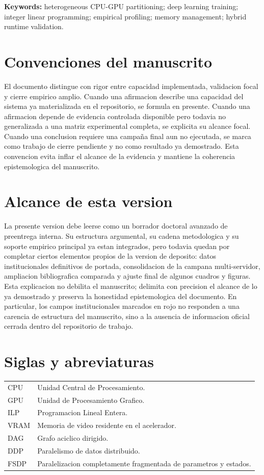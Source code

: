 \vspace{0.6cm}
\noindent\textbf{Keywords:} heterogeneous CPU-GPU partitioning; deep learning training; integer linear programming; empirical profiling; memory management; hybrid runtime validation.

\clearpage

\chapter*{Convenciones del manuscrito}
El documento distingue con rigor entre capacidad implementada, validacion focal y cierre empirico amplio. Cuando una afirmacion describe una capacidad del sistema ya materializada en el repositorio, se formula en presente. Cuando una afirmacion depende de evidencia controlada disponible pero todavia no generalizada a una matriz experimental completa, se explicita su alcance focal. Cuando una conclusion requiere una campaña final aun no ejecutada, se marca como trabajo de cierre pendiente y no como resultado ya demostrado. Esta convencion evita inflar el alcance de la evidencia y mantiene la coherencia epistemologica del manuscrito.

\chapter*{Alcance de esta version}
La presente version debe leerse como un borrador doctoral avanzado de preentrega interna. Su estructura argumental, su cadena metodologica y su soporte empirico principal ya estan integrados, pero todavia quedan por completar ciertos elementos propios de la version de deposito: datos institucionales definitivos de portada, consolidacion de la campana multi-servidor, ampliacion bibliografica comparada y ajuste final de algunos cuadros y figuras. Esta explicacion no debilita el manuscrito; delimita con precision el alcance de lo ya demostrado y preserva la honestidad epistemologica del documento. En particular, los campos institucionales marcados en rojo no responden a una carencia de estructura del manuscrito, sino a la ausencia de informacion oficial cerrada dentro del repositorio de trabajo.

\chapter*{Siglas y abreviaturas}
\small
\begin{tabularx}{\textwidth}{lX}
CPU & Unidad Central de Procesamiento. \\
GPU & Unidad de Procesamiento Grafico. \\
ILP & Programacion Lineal Entera. \\
VRAM & Memoria de video residente en el acelerador. \\
DAG & Grafo aciclico dirigido. \\
DDP & Paralelismo de datos distribuido. \\
FSDP & Paralelizacion completamente fragmentada de parametros y estados. \\
\end{tabularx}
\normalsize